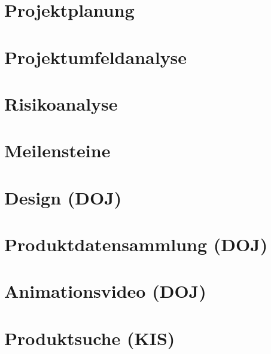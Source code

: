 \documentclass[
    headings=optiontotocandhead,%
    twoside,
    numbers=noenddot,%
    toc=flat, %
    12pt, %
    titlepage, %
    parskip=full, %
    listof=totoc, %
    listof=flat, %
    numbers=noenddot, %
    bibliography=totoc, %
    a4paper,DIV=14,
    BCOR=15mm,
]{scrbook}
\begin{document}

\chapter{Projektplanung}
\renewcommand{\kapitelautor}{Autor: Rafael Doja}


\chapter{Projektumfeldanalyse}
\renewcommand{\kapitelautor}{Autor: Rafael Doja}


\chapter{Risikoanalyse}
\renewcommand{\kapitelautor}{Autor: Rafael Doja}


\chapter{Meilensteine}
\renewcommand{\kapitelautor}{Autor: Rafael Doja}


\chapter{Design (DOJ)}
\renewcommand{\kapitelautor}{Autor: Rafael Doja}


\chapter{Produktdatensammlung (DOJ)}
\renewcommand{\kapitelautor}{Autor: Rafael Doja}

\chapter{Animationsvideo (DOJ)}
\renewcommand{\kapitelautor}{Autor: Rafael Doja}

\chapter{Produktsuche (KIS)}
\renewcommand{\kapitelautor}{Autor: Daniel Kisling}

\end{document}
